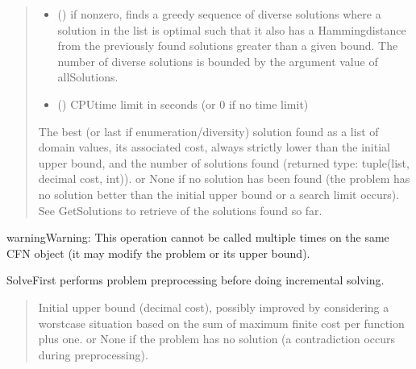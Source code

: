 \documentclass[letterpaper,10pt,openany,oneside,english]{sphinxmanual}
\begin{document}
\begin{fulllineitems}
\begin{fulllineitems}
\begin{quote}
\begin{description}
\begin{itemize}
\item {} 
\sphinxAtStartPar
{} () \textendash{} if non\sphinxhyphen{}zero, finds a greedy sequence of diverse solutions where a solution in the list is optimal
such that it also has a Hamming\sphinxhyphen{}distance from the previously found solutions greater than a given bound.
The number of diverse solutions is bounded by the argument value of allSolutions.

\item {} 
\sphinxAtStartPar
{} () \textendash{} CPU\sphinxhyphen{}time limit in seconds (or 0 if no time limit)

\end{itemize}

\sphinxAtStartPar
The best (or last if enumeration/diversity) solution found as a list of domain values, its associated cost, always strictly lower
than the initial upper bound, and the number of solutions found (returned type: tuple(list, decimal cost, int)).
or None if no solution has been found (the problem has no solution better than the initial upper bound or a search limit occurs).
See GetSolutions to retrieve of the solutions found so far.

\end{description}\end{quote}

\begin{sphinxadmonition}{warning}{Warning:}
\sphinxAtStartPar
This operation cannot be called multiple times on the same CFN object (it may modify the problem or its upper bound).
\end{sphinxadmonition}

\end{fulllineitems}


\begin{fulllineitems}
\label{\detokenize{ref/ref_python:pytoulbar2.CFN.SolveFirst}}
\pysigstartsignatures
{}
\pysigstopsignatures
\sphinxAtStartPar
SolveFirst performs problem preprocessing before doing incremental solving.
\begin{quote}\begin{description}
\sphinxAtStartPar
Initial upper bound (decimal cost), possibly improved by considering a worst\sphinxhyphen{}case situation
based on the sum of maximum finite cost per function plus one.
or None if the problem has no solution (a contradiction occurs during preprocessing).


\end{description}
\end{quote}
\end{fulllineitems}
\end{fulllineitems}
\end{document}
